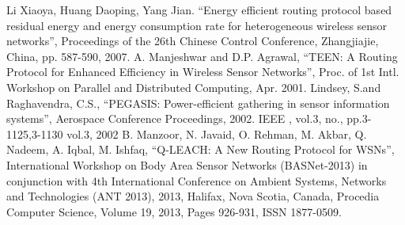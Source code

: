 \documentclass[10pt, conference, compsocconf]{IEEEtran}
\begin{document}
\begin{thebibliography}{1}
 Li Xiaoya, Huang Daoping, Yang Jian. ``Energy efficient routing protocol based residual energy and energy consumption rate for heterogeneous wireless sensor networks'', Proceedings of the 26th Chinese Control Conference, Zhangjiajie, China, pp. 587-590, 2007.
A. Manjeshwar and D.P. Agrawal, ``TEEN: A Routing Protocol for Enhanced Efficiency in Wireless Sensor Networks'', Proc. of 1st Intl. Workshop on Parallel and Distributed Computing, Apr. 2001.
Lindsey, S.and Raghavendra, C.S., ``PEGASIS: Power-efficient gathering in sensor information systems'', Aerospace Conference Proceedings, 2002. IEEE , vol.3, no., pp.3-1125,3-1130 vol.3, 2002
B. Manzoor, N. Javaid, O. Rehman, M. Akbar, Q. Nadeem, A. Iqbal, M. Ishfaq, ``Q-LEACH: A New Routing Protocol for WSNs'', International Workshop on Body Area Sensor Networks (BASNet-2013) in conjunction with 4th International Conference on Ambient Systems, Networks and Technologies (ANT 2013), 2013, Halifax, Nova Scotia, Canada, Procedia Computer Science, Volume 19, 2013, Pages 926-931, ISSN 1877-0509.


\end{thebibliography}
\end{document}
